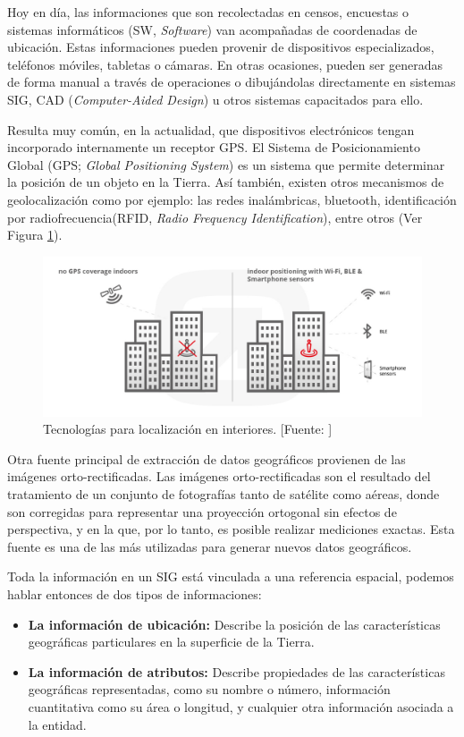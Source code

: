 Hoy en día, las informaciones que son recolectadas en censos, encuestas o sistemas informáticos (SW, \textit{Software}) van acompañadas de coordenadas de ubicación. Estas informaciones pueden provenir de dispositivos especializados, teléfonos móviles, tabletas o cámaras. En otras ocasiones, pueden ser generadas de forma manual a través de operaciones o dibujándolas directamente en sistemas SIG, CAD (\textit{Computer-Aided Design}) u otros sistemas capacitados para ello.

Resulta muy común, en la actualidad, que dispositivos electrónicos tengan incorporado internamente un receptor GPS. El Sistema de Posicionamiento Global (GPS; \textit{Global Positioning System}) es un sistema que permite determinar la posición de un objeto en la Tierra. Así también, existen otros mecanismos de geolocalización como por ejemplo: las redes inalámbricas, bluetooth, identificación por radiofrecuencia(RFID, \textit{Radio Frequency Identification}), entre otros (Ver Figura \ref{fig:interioresTech}).

\begin{figure}[H]
    \centering
    \includegraphics[width=14.5cm]{Indoor_tech.jpg}
    \caption{Tecnologías para localización en interiores. [Fuente: ]}
    \label{fig:interioresTech}
\end{figure}

Otra fuente principal de extracción de datos geográficos provienen de las imágenes orto-rectificadas. Las imágenes orto-rectificadas son el resultado del tratamiento de un conjunto de fotografías tanto de satélite como aéreas, donde son corregidas para representar una proyección ortogonal sin efectos de perspectiva, y en la que, por lo tanto, es posible realizar mediciones exactas. Esta fuente es una de las más utilizadas para generar nuevos datos geográficos.

Toda la información en un SIG está vinculada a una referencia espacial, podemos hablar entonces de dos tipos de informaciones: 
\begin{itemize}
    \item \textbf{La información de ubicación:} 
    Describe la posición de las características geográficas particulares en la superficie de la Tierra.
    \item \textbf{La información de atributos:} 
    Describe propiedades de las características geográficas representadas, como su nombre o número, información cuantitativa como su área o longitud, y cualquier otra información asociada a la entidad.
\end{itemize}

